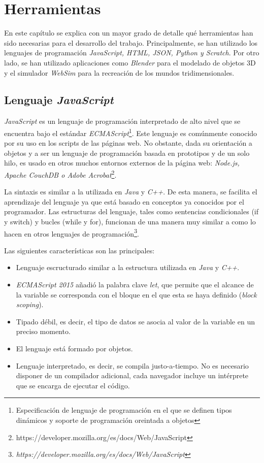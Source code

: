 \chapter{Herramientas}
\label{chap:herramientas} 
En este capítulo se explica con un mayor grado de detalle qué herramientas han sido necesarias para el desarrollo del trabajo. Principalmente, se han utilizado los lenguajes de programación \textit{JavaScript, HTML, JSON, Python y Scratch}. Por otro lado, se han utilizado aplicaciones como \textit{Blender} para el modelado de objetos 3D y el simulador \textit{WebSim} para la recreación de los mundos tridimensionales.
   
\section{Lenguaje \textit{JavaScript}}
\textit{JavaScript} es un lenguaje de programación interpretado de alto nivel que se encuentra bajo el estándar \textit{ECMAScript}\footnote{Especificación de lenguaje de programación en el que se definen tipos dinámicos y soporte de programación oreintada a objetos}. Este lenguaje es comúnmente conocido por su uso en los scripts de las páginas web. No obstante, dada su orientación a objetos y a ser un lenguaje de programación basada en prototipos y de un solo hilo, es usado en otros muchos entornos externos de la página web: \textit{Node.js, Apache CouchDB o Adobe Acrobat}\footnote{https://developer.mozilla.org/es/docs/Web/JavaScript}. \newline

La sintaxis es similar a la utilizada en \textit{Java} y \textit{C++}. De esta manera, se facilita el aprendizaje del lenguaje ya que está basado en conceptos ya conocidos por el programador. Las estructuras del lenguaje, tales como sentencias condicionales (if y switch) y bucles (while y for), funcionan de una manera muy similar a como lo hacen en otros lenguajes de programación\footnote{\textit{https://developer.mozilla.org/es/docs/Web/JavaScript}}. \newline

Las siguientes características son las principales:
\begin{itemize}
    \item Lenguaje escructurado similar a la estructura utilizada en \textit{Java} y \textit{C++}.
    \item \textit{ECMAScript 2015} añadió la palabra clave \textit{let}, que permite que el alcance de la variable se corresponda con el bloque en el que esta se haya definido (\textit{block scoping}).
    \item Tipado débil, es decir, el tipo de datos se asocia al valor de la variable en un preciso momento.
    \item El lenguaje está formado por objetos.
    \item Lenguaje interpretado, es decir, se compila justo-a-tiempo. No es necesario disponer de un compilador adicional, cada navegador incluye un intérprete que se encarga de ejecutar el código.
\end{itemize}

